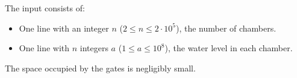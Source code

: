 
    The input consists of:
    \begin{itemize}
        \item One line with an integer $n$ ($2 \le n \le 2\cdot 10^5$), the number of chambers.
        \item One line with $n$ integers $a$ ($1 \le a \le 10^8$), the water level in each chamber.
    \end{itemize}
    The space occupied by the gates is negligibly small.
